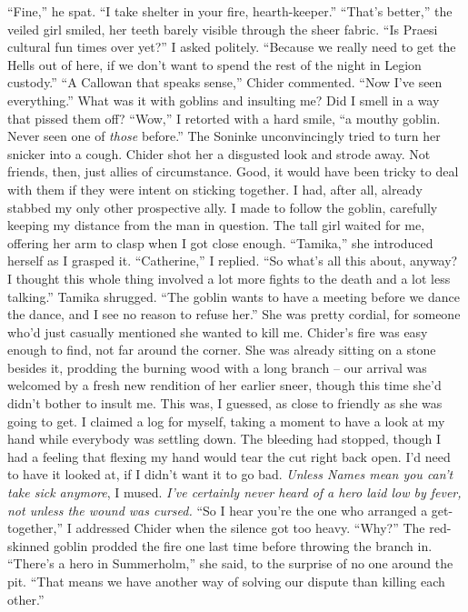 \documentclass[12pt, openany]{book}
\begin{document}
“Fine,” he spat. “I take shelter in your fire, hearth-keeper.”
“That’s better,” the veiled girl smiled, her teeth barely visible through the sheer fabric.
“Is Praesi cultural fun times over yet?” I asked politely. “Because we really need to get the Hells out of here, if we don’t want to spend the rest of the night in Legion custody.”
“A Callowan that speaks sense,” Chider commented. “Now I’ve seen everything.”
What was it with goblins and insulting me? Did I smell in a way that pissed them off?
“Wow,” I retorted with a hard smile, “a mouthy goblin. Never seen one of \textit{those} before.”
The Soninke unconvincingly tried to turn her snicker into a cough. Chider shot her a disgusted look and strode away. Not friends, then, just allies of circumstance. Good, it would have been tricky to deal with them if they were intent on sticking together. I had, after all, already stabbed my only other prospective ally. I made to follow the goblin, carefully keeping my distance from the man in question. The tall girl waited for me, offering her arm to clasp when I got close enough.
“Tamika,” she introduced herself as I grasped it.
“Catherine,” I replied. “So what’s all this about, anyway? I thought this whole thing involved a lot more fights to the death and a lot less talking.”
Tamika shrugged. “The goblin wants to have a meeting before we dance the dance, and I see no reason to refuse her.”
She was pretty cordial, for someone who’d just casually mentioned she wanted to kill me. Chider’s fire was easy enough to find, not far around the corner. She was already sitting on a stone besides it, prodding the burning wood with a long branch – our arrival was welcomed by a fresh new rendition of her earlier sneer, though this time she’d didn’t bother to insult me. This was, I guessed, as close to friendly as she was going to get. I claimed a log for myself, taking a moment to have a look at my hand while everybody was settling down. The bleeding had stopped, though I had a feeling that flexing my hand would tear the cut right back open. I’d need to have it looked at, if I didn’t want it to go bad. \textit{Unless Names mean you can’t take sick anymore}, I mused. \textit{I’ve certainly never heard of a hero laid low by fever, not unless the wound was cursed.}
“So I hear you’re the one who arranged a get-together,” I addressed Chider when the silence got too heavy. “Why?”
The red-skinned goblin prodded the fire one last time before throwing the branch in.
“There’s a hero in Summerholm,” she said, to the surprise of no one around the pit. “That means we have another way of solving our dispute than killing each other.”
\end{document}
